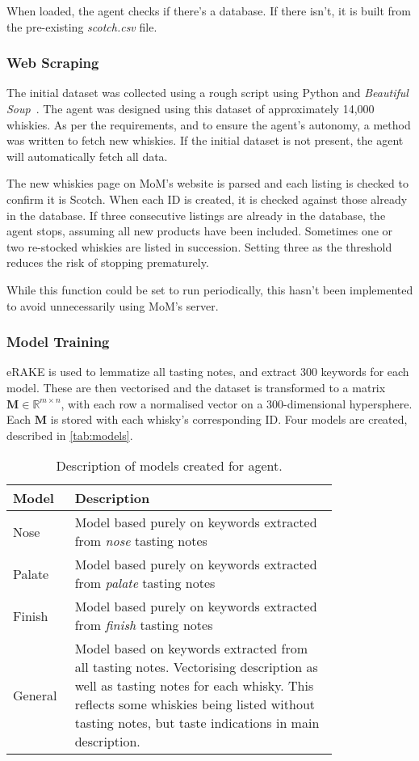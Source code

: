 When loaded, the agent checks if there's a database. If there isn't, it is built from the pre-existing \emph{scotch.csv} file.

\subsubsection{Web Scraping}\label{sssec:scrape}
The initial dataset was collected using a rough script using Python and \emph{Beautiful 
Soup}~\cite{richardson2007beautiful}. The agent was designed using this dataset of approximately 14,000
whiskies.  As per the requirements, and to ensure the agent's autonomy, a method was written to fetch new
whiskies. If the initial dataset is not present, the agent will automatically fetch all data.

The new whiskies page on MoM's website is parsed and each listing
is checked to confirm it is Scotch.  When each ID is created, it is checked against those already in the
database.  If three consecutive listings are already in the database, the agent stops, assuming all new products
have been included. Sometimes one or two re-stocked whiskies are listed in succession.
Setting three as the threshold reduces the risk of stopping prematurely.

While this function could be set to run periodically, this hasn't been implemented to avoid unnecessarily 
using MoM's server.

\subsubsection{Model Training}
eRAKE is used to lemmatize all tasting notes, and extract 300 keywords for each model.  These are 
then vectorised and the dataset is transformed to a matrix $\textbf{M} \in \mathbb{R}^{m \times n}$, with each
row a normalised vector on a 300-dimensional hypersphere. Each $\textbf{M}$ is stored with each whisky's corresponding ID.
Four models are created, described in \autoref{tab:models}.

\begin{table}
    \centering
    \caption{Description of models created for agent.}\label{tab:models}
    \begin{tabular}{p{0.1\linewidth} p{0.7\linewidth}} 
    \toprule
    Model   & Description            \\ \midrule
    Nose    & Model based purely on keywords extracted from \emph{nose} tasting notes  \\
    Palate  & Model based purely on keywords extracted from \emph{palate} tasting notes  \\
    Finish  & Model based purely on keywords extracted from \emph{finish} tasting notes  \\
    General & Model based on keywords extracted from all tasting notes.  Vectorising description as well as tasting notes for each whisky. This reflects some whiskies being listed without tasting notes, but taste indications in main description. \\
    \bottomrule
    \end{tabular}
\end{table}


